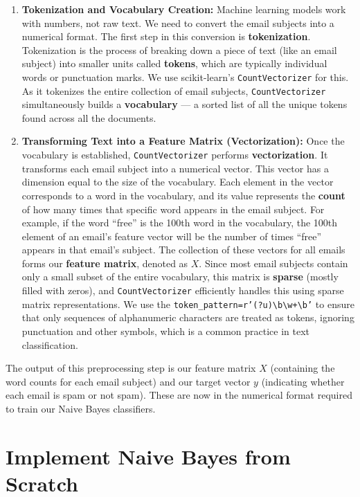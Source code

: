 \documentclass[12pt,letterpaper]{article}
\begin{document}
\begin{enumerate}
    \item \textbf{Tokenization and Vocabulary Creation:} Machine learning models work with numbers, not raw text. We need to convert the email subjects into a numerical format. The first step in this conversion is \textbf{tokenization}. Tokenization is the process of breaking down a piece of text (like an email subject) into smaller units called \textbf{tokens}, which are typically individual words or punctuation marks. We use scikit-learn's \texttt{CountVectorizer} for this. As it tokenizes the entire collection of email subjects, \texttt{CountVectorizer} simultaneously builds a \textbf{vocabulary} --- a sorted list of all the unique tokens found across all the documents.

    \item \textbf{Transforming Text into a Feature Matrix (Vectorization):} Once the vocabulary is established, \texttt{CountVectorizer} performs \textbf{vectorization}. It transforms each email subject into a numerical vector. This vector has a dimension equal to the size of the vocabulary. Each element in the vector corresponds to a word in the vocabulary, and its value represents the \textbf{count} of how many times that specific word appears in the email subject. For example, if the word ``free'' is the 100th word in the vocabulary, the 100th element of an email's feature vector will be the number of times ``free'' appears in that email's subject. The collection of these vectors for all emails forms our \textbf{feature matrix}, denoted as $X$. Since most email subjects contain only a small subset of the entire vocabulary, this matrix is \textbf{sparse} (mostly filled with zeros), and \texttt{CountVectorizer} efficiently handles this using sparse matrix representations. We use the \texttt{token\_pattern=r'(?u)\textbackslash b\textbackslash w+\textbackslash b'} to ensure that only sequences of alphanumeric characters are treated as tokens, ignoring punctuation and other symbols, which is a common practice in text classification.
\end{enumerate}

The output of this preprocessing step is our feature matrix $X$ (containing the word counts for each email subject) and our target vector $y$ (indicating whether each email is spam or not spam). These are now in the numerical format required to train our Naive Bayes classifiers.

\section{Implement Naive Bayes from Scratch}
\end{document}
